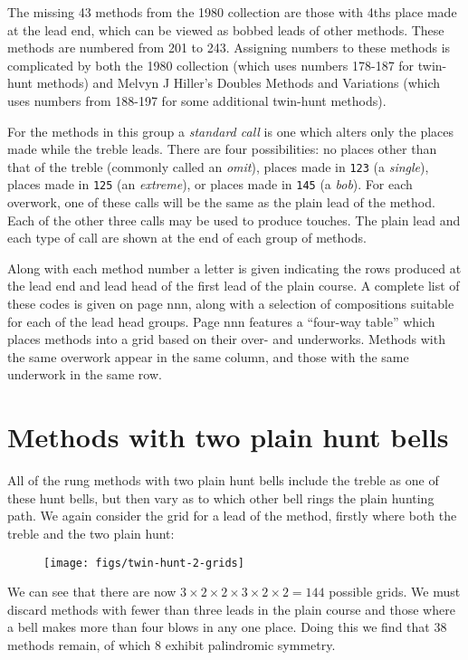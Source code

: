 The missing 43 methods from the 1980 collection are those with 4ths place made
at the lead end, which can be viewed as bobbed leads of other methods.
These methods are numbered from 201 to 243.
Assigning numbers to these methods is complicated by both the 1980 collection
(which uses numbers 178-187 for twin-hunt methods)
and Melvyn J Hiller’s Doubles Methods and Variations
(which uses numbers from 188-197 for some additional twin-hunt methods).

For the methods in this group a \emph{standard call} is one which alters only
the places made while the treble leads.
There are four possibilities:
no places other than that of the treble (commonly called an \emph{omit}),
places made in {\tt 123} (a \emph{single}),
places made in {\tt 125} (an \emph{extreme}),
or places made in {\tt 145} (a \emph{bob}).
For each overwork,
one of these calls will be the same as the plain lead of the method.
Each of the other three calls may be used to produce touches.
The plain lead and each type of call are shown at the end of each group of
methods.

Along with each method number a letter is given indicating the rows produced at
the lead end and lead head of the first lead of the plain course.
A complete list of these codes is given on page nnn,
along with a selection of compositions suitable for each of the lead head
groups.
Page nnn features a “four-way table” which places methods into a grid based on
their over- and underworks.
Methods with the same overwork appear in the same column,
and those with the same underwork in the same row.

\section{Methods with two plain hunt bells} \label{sec:intro-double-hunt}

All of the rung methods with two plain hunt bells include the treble as one of
these hunt bells,
but then vary as to which other bell rings the plain hunting path.
We again consider the grid for a lead of the method,
firstly where both the treble and the two plain hunt:

\begin{figure}[h]
  \centering
  \texttt{[image: figs/twin-hunt-2-grids]}
\end{figure}

We can see that there are now
\(3 \times 2 \times 2 \times 3 \times 2 \times 2 = 144\) possible grids.
We must discard methods with fewer than three leads in the plain course and
those where a bell makes more than four blows in any one place.
Doing this we find that 38 methods remain,
of which 8 exhibit palindromic symmetry.


